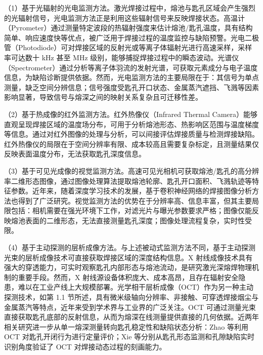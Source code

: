 （1）基于光辐射的光电监测方法。激光焊接过程中，熔池与匙孔区域会产生强烈的光辐射信号，光电监测方法正是利用这些辐射信号来反映焊接状态。高温计（Pyrometer）通过测量特定波段的热辐射强度来估计熔池/匙孔温度，具有结构简单、响应速度快等优点，被广泛用于焊接过程的温度监控与缺陷预警。光电二极管（Photodiode）可对焊接区域的反射光或等离子体辐射光进行高速采样，采样率可达数十 kHz 甚至 MHz 级别，能够捕捉焊接过程中的瞬态波动。光谱仪（Spectrometer）通过分析等离子体羽流的发射光谱，可获取元素成分与电子温度信息，为缺陷诊断提供依据。然而，光电监测方法的主要局限在于：其信号为单点测量，缺乏空间分辨信息；信号强度受匙孔开口状态、金属蒸汽遮挡、飞溅等因素影响显著，导致信号与熔深之间的映射关系复杂且可迁移性差。

（2）基于热成像的红外监测方法。红外热像仪（Infrared Thermal Camera）能够直观呈现焊接区域的温度场分布，可用于分析熔池形态、热影响区范围与温度梯度等信息。通过对红外图像的处理与分析，可以间接评估焊接质量与检测焊接缺陷。红外热像仪的局限在于空间分辨率有限、成本较高且需要复杂标定，且测量结果仅反映表面温度分布，无法获取匙孔深度信息。

（3）基于可见光成像的视觉监测方法。高速可见光相机可获取熔池/匙孔的高分辨率二维形态图像，通过图像处理算法提取熔池轮廓、匙孔开口面积、飞溅轨迹等特征参数。近年来，随着深度学习技术的发展，基于卷积神经网络的焊接图像分析方法也得到了广泛研究。视觉监测方法的优势在于分辨率高、信息丰富，但其主要局限包括：相机需要在强光环境下工作，对滤光片与曝光参数要求严格；图像仅能反映熔池表面的二维形态，无法直接测量匙孔深度；图像处理流程复杂，实时性受限。

（4）基于主动探测的层析成像方法。与上述被动式监测方法不同，基于主动探测光束的层析成像技术可直接获取焊接区域的深度结构信息。X 射线成像技术具有强大的穿透能力，可实时观察匙孔内部形态与熔池流动，是研究激光深熔焊物理机制的重要手段。然而，X 射线源设备体积庞大、成本高昂，且存在辐射安全隐患，难以在工业产线上大规模部署。光学相干层析成像（OCT）作为另一种主动探测技术，如第 1.1 节所述，具有微米级轴向分辨率、非接触、可穿透焊接烟尘与金属蒸汽等特点，近年来受到学术界与工业界的广泛关注。OCT 可通过测量光束直接获取匙孔底部的反射信息，从而为熔深在线测量提供直接的几何依据。近两年相关研究进一步从单一熔深测量转向匙孔稳定性和缺陷状态分析：Zhao 等利用 OCT 对匙孔开闭行为进行定量评价；Xie 等分别从匙孔形态监测和孔隙缺陷实时识别角度验证了 OCT 对焊接动态过程的刻画能力。

